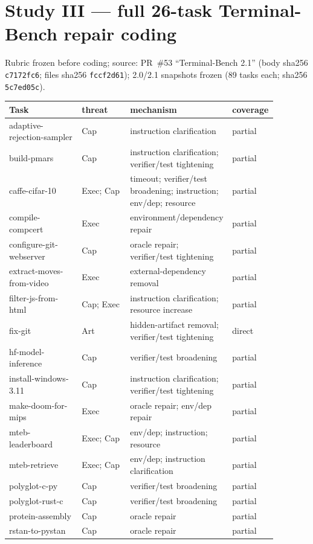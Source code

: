 \documentclass{article}
\begin{document}
\section{Study III --- full 26-task Terminal-Bench repair coding}
Rubric frozen before coding; source: PR~\#53 ``Terminal-Bench 2.1'' (body sha256 \texttt{c7172fc6}; files sha256 \texttt{fccf2d61}); 2.0/2.1 snapshots frozen (89 tasks each; sha256 \texttt{5c7ed05c}).

\begin{longtable}{p{0.27\linewidth} p{0.18\linewidth} p{0.32\linewidth} p{0.11\linewidth}}
\toprule Task & threat & mechanism & coverage \\ \midrule
adaptive-rejection-sampler & Cap & instruction clarification & partial \\
build-pmars & Cap & instruction clarification; verifier/test tightening & partial \\
caffe-cifar-10 & Exec; Cap & timeout; verifier/test broadening; instruction; env/dep; resource & partial \\
compile-compcert & Exec & environment/dependency repair & partial \\
configure-git-webserver & Cap & oracle repair; verifier/test tightening & partial \\
extract-moves-from-video & Exec & external-dependency removal & partial \\
filter-js-from-html & Cap; Exec & instruction clarification; resource increase & partial \\
fix-git & Art & hidden-artifact removal; verifier/test tightening & direct \\
hf-model-inference & Cap & verifier/test broadening & partial \\
install-windows-3.11 & Cap & instruction clarification; verifier/test tightening & partial \\
make-doom-for-mips & Exec & oracle repair; env/dep repair & partial \\
mteb-leaderboard & Exec; Cap & env/dep; instruction; resource & partial \\
mteb-retrieve & Exec; Cap & env/dep; instruction clarification & partial \\
polyglot-c-py & Cap & verifier/test broadening & partial \\
polyglot-rust-c & Cap & verifier/test broadening & partial \\
protein-assembly & Cap & oracle repair & partial \\
rstan-to-pystan & Cap & oracle repair & partial \\

\end{longtable}
\end{document}

